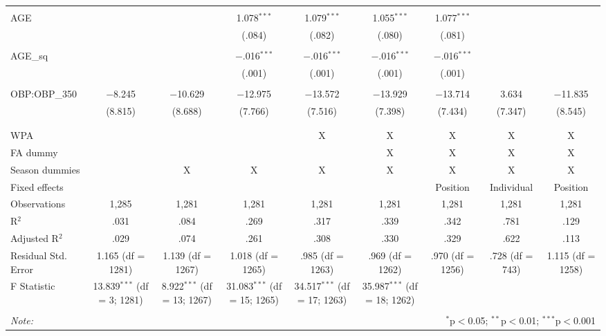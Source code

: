 \begin{table}[H]
\begin{tabular}{@{\extracolsep{5pt}}lcccccccc}
  & & & & & & & & \\
 AGE &  &  & 1.078$^{***}$ & 1.079$^{***}$ & 1.055$^{***}$ & 1.077$^{***}$ &  &  \\
  &  &  & (.084) & (.082) & (.080) & (.081) &  &  \\
  & & & & & & & & \\
 AGE\_sq &  &  & $-$.016$^{***}$ & $-$.016$^{***}$ & $-$.016$^{***}$ & $-$.016$^{***}$ &  &  \\
  &  &  & (.001) & (.001) & (.001) & (.001) &  &  \\
  & & & & & & & & \\
 OBP:OBP\_350 & $-$8.245 & $-$10.629 & $-$12.975 & $-$13.572 & $-$13.929 & $-$13.714 & 3.634 & $-$11.835 \\
  & (8.815) & (8.688) & (7.766) & (7.516) & (7.398) & (7.434) & (7.347) & (8.545) \\
  & & & & & & & & \\
\hline \\[-1.8ex]
WPA &  &  &  & X & X & X & X & X \\
FA dummy &  &  &  &  & X & X & X & X \\
Season dummies &  & X & X & X & X & X & X & X \\
Fixed effects &  &  &  &  &  & Position & Individual & Position \\
Observations & 1,285 & 1,281 & 1,281 & 1,281 & 1,281 & 1,281 & 1,281 & 1,281 \\
R$^{2}$ & .031 & .084 & .269 & .317 & .339 & .342 & .781 & .129 \\
Adjusted R$^{2}$ & .029 & .074 & .261 & .308 & .330 & .329 & .622 & .113 \\
Residual Std. Error & 1.165 (df = 1281) & 1.139 (df = 1267) & 1.018 (df = 1265) & .985 (df = 1263) & .969 (df = 1262) & .970 (df = 1256) & .728 (df = 743) & 1.115 (df = 1258) \\
F Statistic & 13.839$^{***}$ (df = 3; 1281) & 8.922$^{***}$ (df = 13; 1267) & 31.083$^{***}$ (df = 15; 1265) & 34.517$^{***}$ (df = 17; 1263) & 35.987$^{***}$ (df = 18; 1262) &  &  &  \\
\hline
\hline \\[-1.8ex]
\textit{Note:}  & \multicolumn{8}{r}{$^{*}$p$<$0.05; $^{**}$p$<$0.01; $^{***}$p$<$0.001} \\
\end{tabular}
\end{table}
